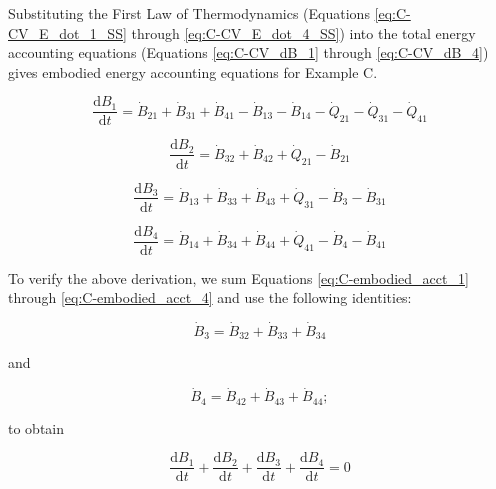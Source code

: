 Substituting the First Law of Thermodynamics (Equations \ref{eq:C-CV_E_dot_1_SS} through \ref{eq:C-CV_E_dot_4_SS}) into the total energy accounting equations (Equations \ref{eq:C-CV_dB_1} through \ref{eq:C-CV_dB_4}) gives embodied energy accounting equations for Example C.

\begin{equation} \label{eq:C-embodied_acct_1}
	\frac{\mathrm{d}B_{1}}{\mathrm{d}t} 	 = \dot{B}_{21} + \dot{B}_{31} + \dot{B}_{41} - \dot{B}_{13} - \dot{B}_{14} - \dot{Q}_{21} - \dot{Q}_{31} - \dot{Q}_{41}
\end{equation}

\begin{equation} \label{eq:C-embodied_acct_2}
	\frac{\mathrm{d}B_{2}}{\mathrm{d}t} 	 = \dot{B}_{32} + \dot{B}_{42} + \dot{Q}_{21} - \dot{B}_{21}
\end{equation}

\begin{equation} \label{eq:C-embodied_acct_3}
	\frac{\mathrm{d}B_{3}}{\mathrm{d}t} 	 = \dot{B}_{13} + \dot{B}_{33} + \dot{B}_{43} + \dot{Q}_{31} - \dot{B}_{3} - \dot{B}_{31}
\end{equation}

\begin{equation} \label{eq:C-embodied_acct_4}
	\frac{\mathrm{d}B_{4}}{\mathrm{d}t}	 = \dot{B}_{14} + \dot{B}_{34} + \dot{B}_{44} + \dot{Q}_{41} - \dot{B}_{4} - \dot{B}_{41}
\end{equation}

To verify the above derivation, we sum Equations \ref{eq:C-embodied_acct_1} through \ref{eq:C-embodied_acct_4} and use the following identities:

\begin{equation} \label{eq:C-B_sum_3_output}
	\dot{B}_3 = \dot{B}_{32} + \dot{B}_{33} + \dot{B}_{34}
\end{equation}

\noindent and

\begin{equation} \label{eq:C-B_sum_4_output}
	\dot{B}_4 = \dot{B}_{42} + \dot{B}_{43} + \dot{B}_{44};
\end{equation}

\noindent to obtain

\begin{equation} \label{eq:C-B_sums_to_zero}
	\frac{\mathrm{d}B_{1}}{\mathrm{d}t} + \frac{\mathrm{d}B_{2}}{\mathrm{d}t} + \frac{\mathrm{d}B_{3}}{\mathrm{d}t} + \frac{\mathrm{d}B_{4}}{\mathrm{d}t} = 0
\end{equation}


